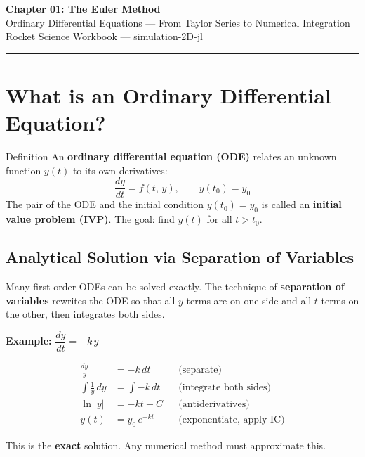 \documentclass[12pt, a4paper]{article}
\begin{document}
\begin{center}
  {\LARGE \textbf{Chapter 01: The Euler Method}}\\[0.5em]
  {\large \textcolor{hintgray}{Ordinary Differential Equations — From Taylor Series to Numerical Integration}}\\[0.3em]
  {\small \textcolor{hintgray}{Rocket Science Workbook — simulation-2D-jl}}
\end{center}
\vspace{1em}\hrule\vspace{1.5em}

\section{What is an Ordinary Differential Equation?}

\begin{theorybox}{Definition}
An \textbf{ordinary differential equation (ODE)} relates an unknown function $y(t)$ to its own derivatives:
\[
  \frac{dy}{dt} = f(t,\, y), \qquad y(t_0) = y_0
\]
The pair of the ODE and the initial condition $y(t_0)=y_0$ is called an \textbf{initial value problem (IVP)}.
The goal: find $y(t)$ for all $t > t_0$.
\end{theorybox}

\subsection*{Analytical Solution via Separation of Variables}

Many first-order ODEs can be solved exactly. The technique of \textbf{separation of variables} rewrites the ODE so that all $y$-terms are on one side and all $t$-terms on the other, then integrates both sides.

\textbf{Example:} $\dfrac{dy}{dt} = -k\,y$

\begin{align*}
  \frac{dy}{y} &= -k\,dt                   && \text{(separate)} \\
  \int \frac{1}{y}\,dy &= \int -k\,dt      && \text{(integrate both sides)} \\
  \ln|y| &= -kt + C                         && \text{(antiderivatives)} \\
  y(t) &= y_0\,e^{-kt}                      && \text{(exponentiate, apply IC)}
\end{align*}

This is the \textbf{exact} solution. Any numerical method must approximate this.
\end{document}
